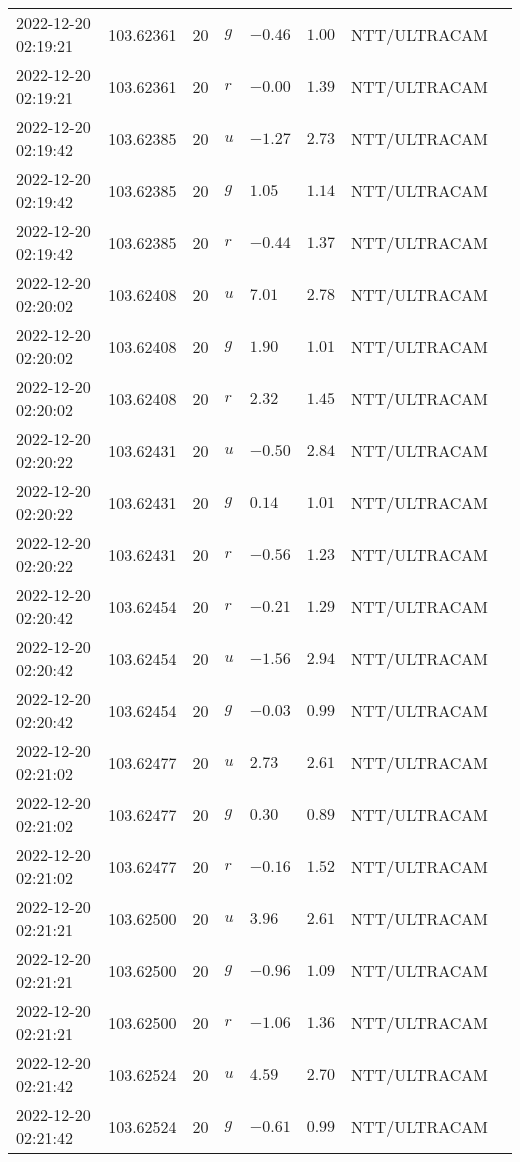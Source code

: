 \documentclass{nature_plusfigure}
\begin{document}
\begin{supplement}
\begin{center}
\begin{longtable}{llllllll}
2022-12-20 02:19:21 & 103.62361 & 20 & $g$ & $-0.46$ & $1.00$ & NTT/ULTRACAM &  \\ 
2022-12-20 02:19:21 & 103.62361 & 20 & $r$ & $-0.00$ & $1.39$ & NTT/ULTRACAM &  \\ 
2022-12-20 02:19:42 & 103.62385 & 20 & $u$ & $-1.27$ & $2.73$ & NTT/ULTRACAM &  \\ 
2022-12-20 02:19:42 & 103.62385 & 20 & $g$ & $1.05$ & $1.14$ & NTT/ULTRACAM &  \\ 
2022-12-20 02:19:42 & 103.62385 & 20 & $r$ & $-0.44$ & $1.37$ & NTT/ULTRACAM &  \\ 
2022-12-20 02:20:02 & 103.62408 & 20 & $u$ & $7.01$ & $2.78$ & NTT/ULTRACAM &  \\ 
2022-12-20 02:20:02 & 103.62408 & 20 & $g$ & $1.90$ & $1.01$ & NTT/ULTRACAM &  \\ 
2022-12-20 02:20:02 & 103.62408 & 20 & $r$ & $2.32$ & $1.45$ & NTT/ULTRACAM &  \\ 
2022-12-20 02:20:22 & 103.62431 & 20 & $u$ & $-0.50$ & $2.84$ & NTT/ULTRACAM &  \\ 
2022-12-20 02:20:22 & 103.62431 & 20 & $g$ & $0.14$ & $1.01$ & NTT/ULTRACAM &  \\ 
2022-12-20 02:20:22 & 103.62431 & 20 & $r$ & $-0.56$ & $1.23$ & NTT/ULTRACAM &  \\ 
2022-12-20 02:20:42 & 103.62454 & 20 & $r$ & $-0.21$ & $1.29$ & NTT/ULTRACAM &  \\ 
2022-12-20 02:20:42 & 103.62454 & 20 & $u$ & $-1.56$ & $2.94$ & NTT/ULTRACAM &  \\ 
2022-12-20 02:20:42 & 103.62454 & 20 & $g$ & $-0.03$ & $0.99$ & NTT/ULTRACAM &  \\ 
2022-12-20 02:21:02 & 103.62477 & 20 & $u$ & $2.73$ & $2.61$ & NTT/ULTRACAM &  \\ 
2022-12-20 02:21:02 & 103.62477 & 20 & $g$ & $0.30$ & $0.89$ & NTT/ULTRACAM &  \\ 
2022-12-20 02:21:02 & 103.62477 & 20 & $r$ & $-0.16$ & $1.52$ & NTT/ULTRACAM &  \\ 
2022-12-20 02:21:21 & 103.62500 & 20 & $u$ & $3.96$ & $2.61$ & NTT/ULTRACAM &  \\ 
2022-12-20 02:21:21 & 103.62500 & 20 & $g$ & $-0.96$ & $1.09$ & NTT/ULTRACAM &  \\ 
2022-12-20 02:21:21 & 103.62500 & 20 & $r$ & $-1.06$ & $1.36$ & NTT/ULTRACAM &  \\ 
2022-12-20 02:21:42 & 103.62524 & 20 & $u$ & $4.59$ & $2.70$ & NTT/ULTRACAM &  \\ 
2022-12-20 02:21:42 & 103.62524 & 20 & $g$ & $-0.61$ & $0.99$ & NTT/ULTRACAM &  \\ 

\end{longtable}
\end{center}
\end{supplement}
\end{document}
